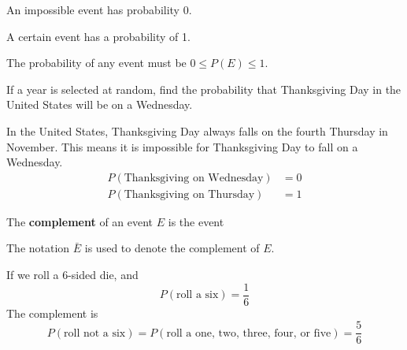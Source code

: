 \documentclass{beamer}
\newcommand{\prob}[1]{P\left(#1\right)}
\begin{document}
\begin{frame}
\begin{definition}
An impossible event has probability 0.

\vspace{2mm}
A certain event has a probability of 1.

\vspace{2mm}
The probability of any event must be $0\leq\prob{E}\leq1$.
\end{definition}\pause

\begin{example}
If a year is selected at random, find the probability that Thanksgiving Day in the United States will be on a Wednesday.\pause

\vspace{2mm}
In the United States, Thanksgiving Day always falls on the fourth Thursday in November. This means it is impossible for Thanksgiving Day to fall on a Wednesday.
\begin{equation*}
\begin{aligned}
\prob{\text{Thanksgiving on Wednesday}}&=0\\
\prob{\text{Thanksgiving on Thursday}}&=1
\end{aligned}
\end{equation*}
\end{example}
\end{frame}

\begin{frame}
\begin{definition}
The \textbf{complement} of an event $E$ is the event 

\vspace{2mm}
The notation $\bar{E}$ is used to denote the complement of $E$.
\end{definition}\pause

\begin{example}
If we roll a 6-sided die, and
\begin{equation*}
\prob{\text{roll a six}} = \dfrac{1}{6}
\end{equation*}
The complement is
\begin{equation*}
\prob{\text{roll not a six}} = \prob{\text{roll a one, two, three, four, or five}} = \dfrac{5}{6}
\end{equation*}
\end{example}
\end{frame}
\end{document}

